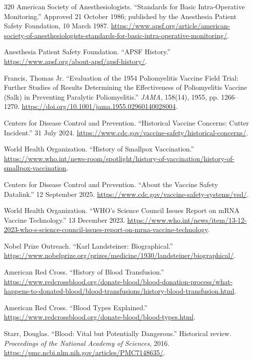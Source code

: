 \documentclass[12pt,oneside]{book}
\begin{document}
\begin{thebibliography}{320}
American Society of Anesthesiologists. ``Standards for Basic Intra-Operative
Monitoring.'' Approved 21 October 1986; published by the Anesthesia Patient
Safety Foundation, 10 March 1987.
\url{https://www.apsf.org/article/american-society-of-anesthesiologists-standards-for-basic-intra-operative-monitoring/}.

Anesthesia Patient Safety Foundation. ``APSF History.''
\url{https://www.apsf.org/about-apsf/apsf-history/}.

Francis, Thomas Jr. ``Evaluation of the 1954 Poliomyelitis Vaccine Field Trial:
Further Studies of Results Determining the Effectiveness of Poliomyelitis
Vaccine (Salk) in Preventing Paralytic Poliomyelitis.'' \emph{JAMA}, 158(14),
1955, pp. 1266--1270. \url{https://doi.org/10.1001/jama.1955.02960140028004}.

Centers for Disease Control and Prevention. ``Historical Vaccine Concerns:
Cutter Incident.'' 31 July 2024.
\url{https://www.cdc.gov/vaccine-safety/historical-concerns/}.

World Health Organization. ``History of Smallpox Vaccination.''
\url{https://www.who.int/news-room/spotlight/history-of-vaccination/history-of-smallpox-vaccination}.

Centers for Disease Control and Prevention. ``About the Vaccine Safety
Datalink.'' 12 September 2025.
\url{https://www.cdc.gov/vaccine-safety-systems/vsd/}.

World Health Organization. ``WHO's Science Council Issues Report on mRNA
Vaccine Technology.'' 13 December 2023.
\url{https://www.who.int/news/item/13-12-2023-who-s-science-council-issues-report-on-mrna-vaccine-technology}.

Nobel Prize Outreach. ``Karl Landsteiner: Biographical.''
\url{https://www.nobelprize.org/prizes/medicine/1930/landsteiner/biographical/}.

American Red Cross. ``History of Blood Transfusion.''
\url{https://www.redcrossblood.org/donate-blood/blood-donation-process/what-happens-to-donated-blood/blood-transfusions/history-blood-transfusion.html}.

American Red Cross. ``Blood Types Explained.''
\url{https://www.redcrossblood.org/donate-blood/blood-types.html}.

Starr, Douglas. ``Blood: Vital but Potentially Dangerous.'' Historical review.
\emph{Proceedings of the National Academy of Sciences}, 2016.
\url{https://pmc.ncbi.nlm.nih.gov/articles/PMC7148635/}.


\end{thebibliography}
\end{document}
